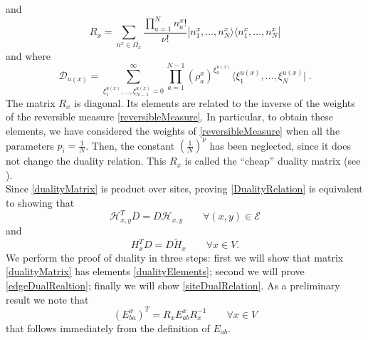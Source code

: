 \documentclass[10pt]{article}
\numberwithin{equation}{section}
\numberwithin{equation}{subsection}
\newcommand{\dt}{\;.}
\newcommand{\dd}{\mathcal{D}_{u(x)}}
\begin{document}
and
\begin{equation}\label{Revmatrix}
    R_{x}=\sum_{n^{x}\in\Omega_{x}}\frac{\prod_{a=1}^{N}n_{a}^{x}!}{\nu!}|n_{1}^{x},\ldots,n_{N}^{x}\rangle\langle n_{1}^{x},\ldots,n_{N}^{x}|
\end{equation}
and where 
\begin{equation}\label{dualityMatrix2}
\dd=\sum_{\xi_{1}^{u(x)},\ldots,\xi_{N-1}^{u(x)}=0}^{\infty}\prod_{a=1}^{N-1}\left(\rho_{a}^{x}\right)^{\xi_{a}^{u(x)}}\langle \xi_{1}^{u(x)},\ldots,\xi_{N}^{u(x)}|\dt
\end{equation}
The matrix $R_{x}$ is diagonal. Its elements are related to the inverse of the weights of the reversible measure \eqref{reversibleMeasure}. In particular, to obtain these elements, we have considered the weights of \eqref{reversibleMeasure} when all the parameters $p_{i}=\frac{1}{N}$. Then, the constant $\left(\frac{1}{N}\right)^{\nu}$ has been neglected, since it does not change the duality relation. This $R_{x}$ is called the ``cheap'' duality matrix (see \cite{giardina2009duality}). \\
Since \eqref{dualityMatrix} is product over sites, proving \eqref{DualityRelation} is equivalent to showing that 
\begin{equation}\label{edgeDualRealtion}
    \mathcal{H}_{x,y}^{T}D=D\mathcal{H}_{x,y}\qquad \forall (x,y)\in \mathcal{E}
\end{equation}
and 
\begin{equation}\label{siteDualRelation}
    H_{x}^{T}D=D\widetilde{H}_{x}\qquad \forall x\in V.
\end{equation}
We perform the proof of duality in three steps: first we will show that matrix \eqref{dualityMatrix} has elements \eqref{dualityElements}; second we will prove \eqref{edgeDualRealtion}; finally we will show \eqref{siteDualRelation}. 
As a preliminary result we note that 
\begin{equation}\label{transpositionPropertyR}
(E_{ba}^{x})^{T}=R_{x}E_{ab}^{x}R_{x}^{-1}\qquad \forall x\in V
\end{equation}
that follows immediately from the definition of $E_{ab}$. 
\begin{comment}

\begin{align*}
R_{x}E_{ab}^{x}R_{x}^{-1}=&\sum_{r^{x}\in\Omega_{x}}\frac{\xi_{1}^{x}!\ldots r_{N}!}{\nu!}|\xi_{1}^{x},\ldots,\xi_{N}^{x}\rangle \langle \xi_{1}^{x},\ldots, \xi_{N}^{x}|
	\\&
	\sum_{s^{x}\in \Omega_{x},}s_{b}^{x}|s_{1}^{x},\ldots,s_{a}^{x}+1,\ldots,s_{b}^{x}-1,\ldots s_{N}^{x}\rangle \langle s_{1}^{x},\ldots,s_{N}^{x}|
	\\&
	\sum_{n^{x}\in\Omega_{x}}\frac{\nu!}{n_{1}!\ldots n_{N}!}|n_{1}^{x},\ldots,n_{N}^{x}\rangle \langle n_{1}^{x},\ldots, n_{N}^{x}|
 \\=&\sum_{r^{x}\in \Omega_{x}}
	\xi_{a}^{x}|\xi_{1}^{x},\ldots,\xi_{N}^{x}\rangle \langle \xi_{1}^{x},\ldots,\xi_{a}^{x}-1,\ldots,r_{b}^{x}-1,\ldots,\xi_{N}^{x}|
	\\=&
	\left(E_{ba}^{x}\right)^{T}
\end{align*}
where in the up to last equation we used the orthogonality relation \eqref{ortho}. 
\end{comment}
\end{document}
